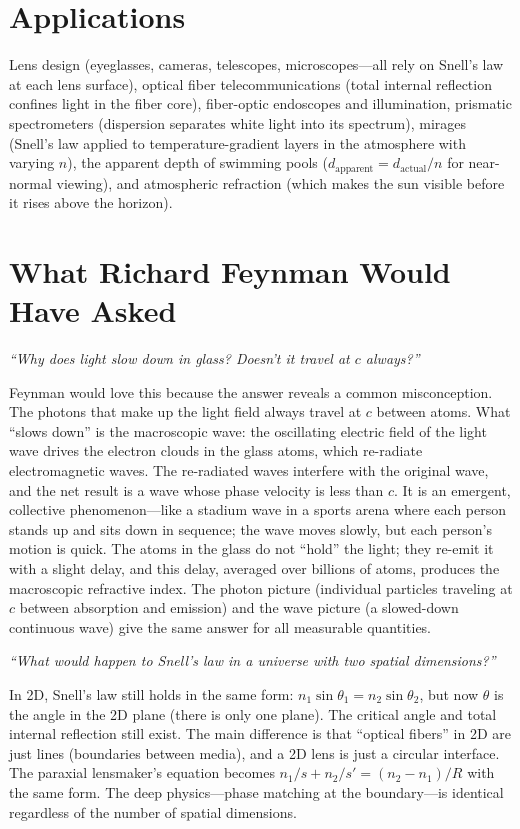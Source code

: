 \section*{Applications}

Lens design (eyeglasses, cameras, telescopes, microscopes---all rely on Snell's law at each lens surface), optical fiber telecommunications (total internal reflection confines light in the fiber core), fiber-optic endoscopes and illumination, prismatic spectrometers (dispersion separates white light into its spectrum), mirages (Snell's law applied to temperature-gradient layers in the atmosphere with varying $n$), the apparent depth of swimming pools ($d_{\text{apparent}} = d_{\text{actual}}/n$ for near-normal viewing), and atmospheric refraction (which makes the sun visible before it rises above the horizon).
\section*{What Richard Feynman Would Have Asked}

\textit{``Why does light slow down in glass? Doesn't it travel at $c$ always?''}

Feynman would love this because the answer reveals a common misconception. The photons that make up the light field always travel at $c$ between atoms. What ``slows down'' is the macroscopic wave: the oscillating electric field of the light wave drives the electron clouds in the glass atoms, which re-radiate electromagnetic waves. The re-radiated waves interfere with the original wave, and the net result is a wave whose phase velocity is less than $c$. It is an emergent, collective phenomenon---like a stadium wave in a sports arena where each person stands up and sits down in sequence; the wave moves slowly, but each person's motion is quick. The atoms in the glass do not ``hold'' the light; they re-emit it with a slight delay, and this delay, averaged over billions of atoms, produces the macroscopic refractive index. The photon picture (individual particles traveling at $c$ between absorption and emission) and the wave picture (a slowed-down continuous wave) give the same answer for all measurable quantities.

\textit{``What would happen to Snell's law in a universe with two spatial dimensions?''}

In 2D, Snell's law still holds in the same form: $n_1\sin\theta_1 = n_2\sin\theta_2$, but now $\theta$ is the angle in the 2D plane (there is only one plane). The critical angle and total internal reflection still exist. The main difference is that ``optical fibers'' in 2D are just lines (boundaries between media), and a 2D lens is just a circular interface. The paraxial lensmaker's equation becomes $n_1/s + n_2/s' = (n_2 - n_1)/R$ with the same form. The deep physics---phase matching at the boundary---is identical regardless of the number of spatial dimensions.

